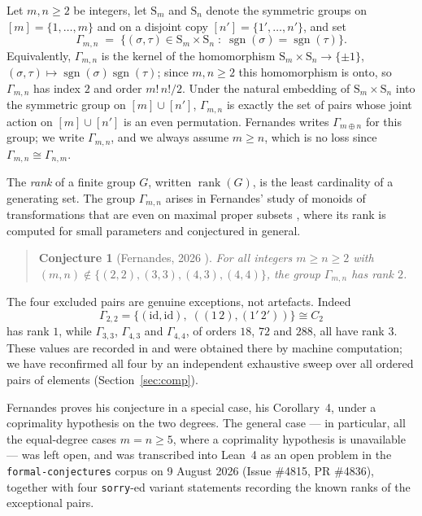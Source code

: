 \documentclass[11pt]{article}
\theoremstyle{plain}
\theoremstyle{definition}
\theoremstyle{remark}
\numberwithin{equation}{section}
\newcommand{\Sym}{\mathrm{S}}
\newcommand{\Gam}{\Gamma}
\DeclareMathOperator{\sgn}{sgn}
\DeclareMathOperator{\rank}{rank}
\begin{document}
Let $m,n \ge 2$ be integers, let $\Sym_m$ and $\Sym_n$ denote the symmetric groups on
$[m] = \{1,\dots,m\}$ and on a disjoint copy $[n'] = \{1',\dots,n'\}$, and set
\begin{equation}
\label{eq:gammadef}
\Gam_{m,n} \;=\; \bigl\{(\sigma,\tau) \in \Sym_m \times \Sym_n \;:\;
   \sgn(\sigma) = \sgn(\tau)\bigr\}.
\end{equation}
Equivalently, $\Gam_{m,n}$ is the kernel of the homomorphism
$\Sym_m \times \Sym_n \to \{\pm1\}$, $(\sigma,\tau) \mapsto \sgn(\sigma)\sgn(\tau)$; since
$m,n \ge 2$ this homomorphism is onto, so $\Gam_{m,n}$ has index $2$ and order $m!\,n!/2$. Under
the natural embedding of $\Sym_m \times \Sym_n$ into the symmetric group on
$[m] \cup [n']$, $\Gam_{m,n}$ is exactly the set of pairs whose joint action on
$[m] \cup [n']$ is an even permutation. Fernandes writes $\Gam_{m\oplus n}$ for this group; we
write $\Gam_{m,n}$, and we always assume $m \ge n$, which is no loss since
$\Gam_{m,n} \cong \Gam_{n,m}$.

The \emph{rank} of a finite group $G$, written $\rank(G)$, is the least cardinality of a
generating set. The group $\Gam_{m,n}$ arises in Fernandes' study of monoids of transformations
that are even on maximal proper subsets \cite{fernandes}, where its rank is computed for small
parameters and conjectured in general.

\begin{quote}
\textbf{Conjecture 1} (Fernandes, 2026 \cite{fernandes}). \emph{For all integers
$m \ge n \ge 2$ with $(m,n) \notin \{(2,2),(3,3),(4,3),(4,4)\}$, the group $\Gam_{m,n}$ has rank
$2$.}
\end{quote}

The four excluded pairs are genuine exceptions, not artefacts. Indeed
\[
\Gam_{2,2} = \bigl\{(\mathrm{id},\mathrm{id}),\; ((1\,2),(1'\,2'))\bigr\} \cong C_2
\]
has rank $1$, while $\Gam_{3,3}$, $\Gam_{4,3}$ and $\Gam_{4,4}$, of orders $18$, $72$ and $288$,
all have rank $3$. These values are recorded in \cite{fernandes} and were obtained there by
machine computation; we have reconfirmed all four by an independent exhaustive sweep over all
ordered pairs of elements (Section~\ref{sec:comp}).

Fernandes proves his conjecture in a special case, his Corollary~4, under a coprimality
hypothesis on the two degrees. The general case --- in particular, all the equal-degree cases
$m = n \ge 5$, where a coprimality hypothesis is unavailable --- was left open, and was
transcribed into Lean~4 as an open problem in the \texttt{formal-conjectures} corpus
\cite{formalconjectures} on 9 August 2026 (Issue \#4815, PR \#4836), together with four
\texttt{sorry}-ed variant statements recording the known ranks of the exceptional pairs.
\end{document}
